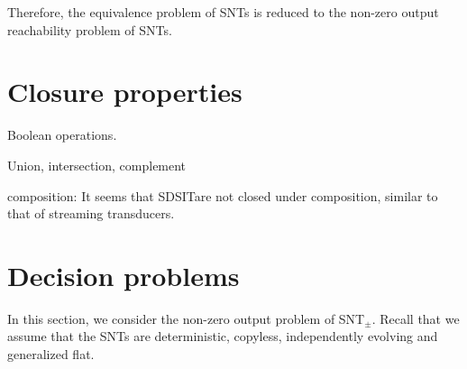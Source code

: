 \documentclass[runningheads,a4paper]{llncs}
\def\Ss{{\mathcal{S} }}
\newcommand{\yfc}[1]{\color{blue} {YF: #1 :FY} \color{black}}
\newcommand{\SDSIT}{SDSIT}
\begin{document}
Therefore, the equivalence problem of SNTs is reduced to the non-zero output reachability problem of SNTs.

\section{Closure properties}

Boolean operations.

Union, intersection, complement

composition: It seems that \SDSIT are not closed under composition, similar to that of streaming transducers.

\section{Decision problems}

In this section, we consider the non-zero output problem of SNT$_{\pm}$. Recall that we assume that the SNTs are deterministic, copyless, independently evolving and generalized flat.

%



\end{document}
